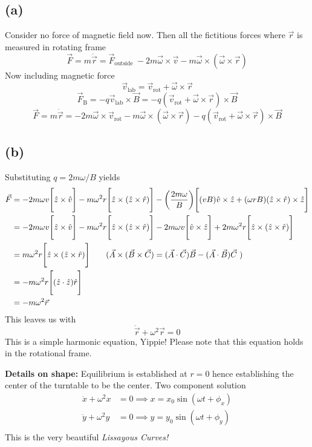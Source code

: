 \documentclass[letter, 10pts]{article}
\begin{document}
\subsection*{(a)}
Consider no force of magnetic field now. Then all the fictitious forces where $\vec{r}$ is measured in rotating frame
\[
\vec{F}  = m \ddot{\vec{r}}= \vec{F}_\text{outside } - 2m  \vec{\omega} \times \vec{v} 
- m \vec{\omega} \times (\vec{\omega} \times \vec{r})
\] 
Now including magnetic force
\[
\vec{v}_\text{lab} = \vec{v}_\text{rot} + \vec{\omega}\times \vec{r}
\] 
\[
\vec{F}_\text{B} = - q \vec{v}_\text{lab} \times \vec{B} = -q  (\vec{v}_\text{rot} + \vec{\omega} \times  \vec{r} ) \times \vec{B}
\] 
\[\boxed{
\vec{F}  = m \ddot{\vec{r}}= - 2m  \vec{\omega} \times \vec{v}_\text{rot} 
- m \vec{\omega} \times (\vec{\omega} \times \vec{r})
- q (\vec{v}_\text{rot} + \vec{\omega} \times  \vec{r} )\times \vec{B}
} \] 

\subsection*{(b)} 
Substituting $q = 2 m \omega / B$ yields 
\begin{align*}
	\vec{F} &= - 2m \omega v 
\Biggr[ 
\hat{z} \times \hat{v}
\Biggr]
- m \omega^2 r \Biggr[ \hat{z} \times (\hat{z} \times \hat{r} ) \Biggr]- 
\left(
\frac{2 m \omega}{B}
\right) \Biggr[(vB)\hat{v} \times \hat{z} + (\omega rB)(\hat{z} \times  \hat{r}) \times \hat{z}\Biggr] \\
	&= - 2m \omega v 
\Biggr[ 
\hat{z} \times \hat{v}
\Biggr]
- m \omega^2 r \Biggr[ \hat{z} \times (\hat{z} \times \hat{r} ) \Biggr]- 
2 m \omega v  \Biggr[\hat{v} \times \hat{z} \Biggr]
+
2 m \omega^2 r \Biggr[ \hat{z} \times (\hat{z} \times  \hat{r})\Biggr] \\
	&= 
 m \omega^2 r \Biggr[ \hat{z} \times (\hat{z} \times \hat{r} ) \Biggr] 
\tag{$\vec{A} \times (\vec{B} \times \vec{C}) = (\vec{A} \cdot  \vec{C} ) \vec{B} 
- (\vec{A} \cdot  \vec{B}) \vec{C}$ }
     \\ &=
- m \omega^2 r \Biggr[ (\hat{z}\cdot \hat{z} ) \hat{r} \Biggr]
									\\ &= 
	-							 m \omega^2 \vec{r}
\end{align*}
This leaves us with 
\[
\ddot{\vec{r}} + \omega^2 \vec{r} = 0
\] 
This is a simple harmonic equation, Yippie! Please note that this equation holds in the rotational frame. 




\textbf{Details on shape: } Equilibrium is established at $r = 0$ hence establishing the center of the turntable to be the center. Two component solution 
\begin{align*}
	\ddot{x} + \omega^2 x &= 0  \implies x = x_0 \sin(\omega t + \phi_x)\\ 
	\ddot{y} + \omega^2 y &= 0 \implies y = y_0 \sin(\omega t + \phi_y)\\ 
\end{align*}
This is the very beautiful \emph{Lissayous Curves!}
\end{document}
